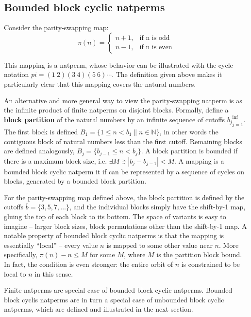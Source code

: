 \documentclass[12pt,reqno]{article}
\begin{document}
\subsection{Bounded block cyclic natperms}

Consider the parity-swapping map:
\begin{equation}
    \pi(n) = \begin{cases}
        n + 1, & \text{if n is odd} \\
        n - 1, & \text{if n is even}
    \end{cases}
\end{equation}

This mapping is a natperm, whose behavior can be illustrated with the cycle notation $pi = (1 \ 2)(3 \ 4)(5 \ 6)\cdots$. The definition given above makes it particularly clear that this mapping covers the natural numbers.

An alternative and more general way to view the parity-swapping natperm is as the infinite product of finite natperms on disjoint blocks. Formally, define a \textbf{block partition} of the natural numbers by an infinite sequence of cutoffs ${b_j}_{j=1}^{\inf}$. The first block is defined $B_1 = \{ 1 \leq n < b_1 \| n \in \mathbb{N} \}$, in other words the contiguous block of natural numbers less than the first cutoff. Remaining blocks are defined analogously,  $B_j = \{ b_{j-1} \leq n < b_j \}$. A block partition is bounded if there is a maximum block size, i.e. $\exists M \ni |b_j - b_{j-1}| < M$. A mapping is a bounded block cyclic natperm it if can be represented by a sequence of cycles on blocks, generated by a bounded block partition.

For the parity-swapping map defined above, the block partition is defined by the cutoffs $\bar{b} = \{ 3, 5, 7, \ldots \}$, and the individual blocks simply have the shift-by-1 map, gluing the top of each block to its bottom. The space of variants is easy to imagine -- larger block sizes, block permutations other than the shift-by-1 map. A notable property of bounded block cyclic natperms is that the mapping is essentially ``local'' -- every value $n$ is mapped to some other value near $n$. More specifically, $\pi(n) - n \leq M$ for some $M$, where $M$ is the partition block bound. In fact, the condition is even stronger: the entire orbit of $n$ is constrained to be local to $n$ in this sense.

Finite natperms are special case of bounded block cyclic natperms. Bounded block cyclis natperms are in turn a special case of unbounded block cyclic natperms, which are defined and illustrated in the next section.
\end{document}
